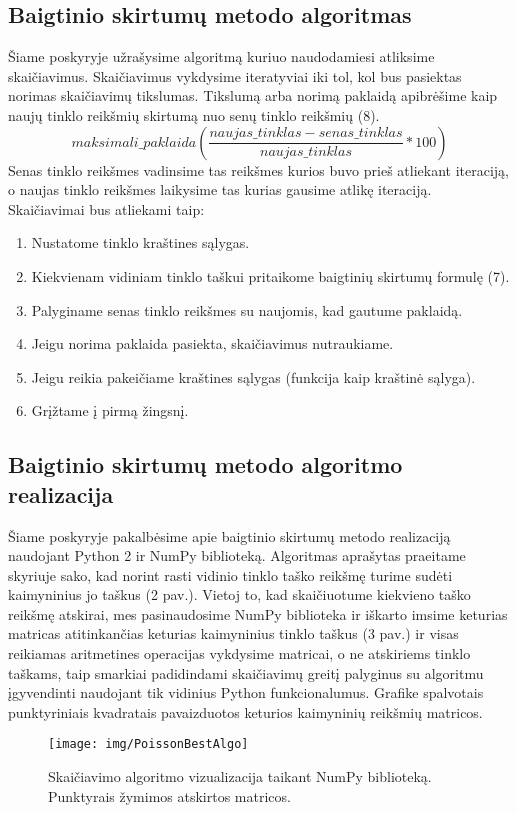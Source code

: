 \documentclass{VUMIFPSkursinis}
\begin{document}
\subsection{Baigtinio skirtumų metodo algoritmas}
Šiame poskyryje užrašysime algoritmą kuriuo naudodamiesi atliksime skaičiavimus.
Skaičiavimus vykdysime iteratyviai iki tol, kol bus pasiektas norimas skaičiavimų tikslumas.
Tikslumą arba norimą paklaidą apibrėšime kaip naujų tinklo reikšmių skirtumą nuo senų tinklo reikšmių (8). 
\begin{equation}
maksimali\_paklaida(\frac{naujas\_tinklas - senas\_tinklas}{naujas\_tinklas} * 100)
\end{equation}
Senas tinklo reikšmes vadinsime tas reikšmes kurios buvo prieš atliekant iteraciją, o naujas tinklo reikšmes laikysime tas kurias gausime atlikę iteraciją.
Skaičiavimai bus atliekami taip:
\begin{enumerate}
\item{Nustatome tinklo kraštines sąlygas.}
\item{Kiekvienam vidiniam tinklo taškui pritaikome baigtinių skirtumų formulę (7).}
\item{Palyginame senas tinklo reikšmes su naujomis, kad gautume paklaidą.}
\item{Jeigu norima paklaida pasiekta, skaičiavimus nutraukiame.}
\item{Jeigu reikia pakeičiame kraštines sąlygas (funkcija kaip kraštinė sąlyga).}
\item{Grįžtame į pirmą žingsnį.}
\end{enumerate}
\subsection{Baigtinio skirtumų metodo algoritmo realizacija}
Šiame poskyryje pakalbėsime apie baigtinio skirtumų metodo realizaciją naudojant Python 2 ir NumPy biblioteką.
Algoritmas aprašytas praeitame skyriuje sako, kad norint rasti vidinio tinklo taško reikšmę turime sudėti kaimyninius jo taškus (2 pav.).
Vietoj to, kad skaičiuotume kiekvieno taško reikšmę atskirai, mes pasinaudosime NumPy biblioteka ir iškarto imsime keturias matricas atitinkančias keturias kaimyninius tinklo taškus (3 pav.) ir visas reikiamas aritmetines operacijas vykdysime matricai, o ne atskiriems tinklo taškams, taip smarkiai padidindami skaičiavimų greitį palyginus su algoritmu įgyvendinti naudojant tik vidinius Python funkcionalumus. 
Grafike spalvotais punktyriniais kvadratais pavaizduotos keturios kaimyninių reikšmių matricos.
\begin{figure}[H]
\centering
\texttt{[image: img/PoissonBestAlgo]}
\caption{Skaičiavimo algoritmo vizualizacija taikant NumPy biblioteką. Punktyrais žymimos atskirtos matricos.} %
\label{img:text}
\end{figure}
\end{document}
